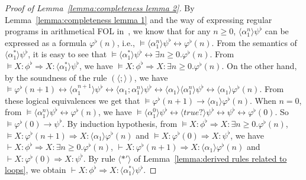 \documentclass[manuscript,screen]{acmart}
\newcommand{\la}[0]{\langle}
\newcommand{\ra}[0]{\rangle}
\newcommand{\true}[0]{\mathit{true}}
\DeclareMathOperator{\seq}{;}
\newcommand{\lup}[0]{*}
\begin{document}
\begin{proof}[Proof of Lemma~\ref{lemma:completeness lemma 2}]
    By Lemma~\ref{lemma:completeness lemma 1} and the way of expressing regular programs in arithmetical FOL in~\cite{Harel00}, 
    we know that for any $n\ge 0$, $\la\alpha^n_1\ra\psi^\flat$ can be expressed as a formula $\varphi^\flat(n)$, i.e., $\models \la\alpha^n_1\ra\psi^\flat\leftrightarrow \varphi^\flat(n)$. 
    From the semantics of $\la\alpha^\lup_1\ra\psi^\flat$, it is easy to see that $\models \la\alpha^\lup_1\ra\psi^\flat\leftrightarrow \exists n\ge 0.\varphi^\flat(n)$. 
    From $\models X : \phi^\flat\Rightarrow X : \la\alpha^\lup_1\ra\psi^\flat$, we have $\models X : \phi^\flat\Rightarrow X : \exists n\ge 0.\varphi^\flat(n)$. 
On the other hand, by the soundness of the rule $(\la\seq\ra)$, we have 
    $\models\varphi^\flat(n+1)\leftrightarrow \la\alpha^{n+1}_1\ra\psi^\flat\leftrightarrow \la\alpha_1\seq\alpha^{n}_1\ra\psi^\flat\leftrightarrow \la\alpha_1\ra\la\alpha^n_1\ra\psi^\flat\leftrightarrow \la \alpha_1\ra\varphi^\flat(n)$. 
    From these logical equivalences we get that $\models \varphi^\flat(n+1)\to \la\alpha_1\ra\varphi^\flat(n)$.  
    When $n=0$, from $\models \la\alpha^n_1\ra\psi^\flat\leftrightarrow \varphi^\flat(n)$, %
    we have $\models \la \alpha^0_1\ra\psi^\flat\leftrightarrow \la\true?\ra\psi^\flat\leftrightarrow \psi^\flat\leftrightarrow \varphi^\flat(0)$. 
    So $\models \varphi^\flat(0)\to \psi^\flat$. 
    By induction hypothesis, from 
    $\models X : \phi^\flat\Rightarrow X : \exists n\ge 0.\varphi^\flat(n)$, 
    $\models X : \varphi^\flat(n+1)\Rightarrow X : \la\alpha_1\ra\varphi^\flat(n)$ and 
    $\models X : \varphi^\flat(0)\Rightarrow X :\psi^\flat$, 
    we have 
    $\vdash X : \phi^\flat\Rightarrow X : \exists n\ge 0.\varphi^\flat(n)$, 
    $\vdash X : \varphi^\flat(n+1)\Rightarrow X : \la\alpha_1\ra\varphi^\flat(n)$ and 
    $\vdash X : \varphi^\flat(0)\Rightarrow X :\psi^\flat$. 
    By rule $\la\lup'\ra$ of Lemma~\ref{lemma:derived rules related to loops}, we obtain 
    $\vdash X : \phi^\flat\Rightarrow X : \la\alpha^\lup_1\ra\psi^\flat$. 
\end{proof}
\end{document}
